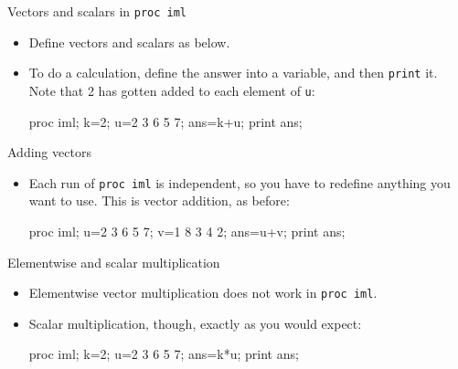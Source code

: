 \documentclass[unknownkeysallowed]{beamer}\usepackage[]{graphicx}\usepackage[]{color}
\begin{document}
\begin{frame}[fragile]{Vectors and scalars in \texttt{proc iml}}
  
  \begin{itemize}
  \item Define vectors and scalars as below.
    \item To do a calculation, define the answer into a variable, and
      then \texttt{print} it. Note that 2 has gotten added to each
      element of \texttt{u}:
    
    \begin{Sascode}[store=ima]
proc iml;
  k=2;
  u={2 3 6 5 7};
  ans=k+u;
  print ans;
    \end{Sascode}
    
      
  \end{itemize}
  
\end{frame}


\begin{frame}[fragile]{Adding vectors}
  
  \begin{itemize}
  \item Each run of \texttt{proc iml} is independent, so you have to
    redefine anything you want to use. This is vector addition, as before:
    
    \begin{Sascode}[store=imb]
proc iml;
  u={2 3 6 5 7};
  v={1 8 3 4 2};
  ans=u+v;
  print ans;
    \end{Sascode}
    
    
  \end{itemize}
  
\end{frame}

\begin{frame}[fragile]{Elementwise and scalar multiplication}
  
  \begin{itemize}
  \item Elementwise vector multiplication does not work in
    \texttt{proc iml}.
  \item Scalar multiplication, though, exactly as you would expect:

        \begin{Sascode}[store=imc]
proc iml;
  k=2;
  u={2 3 6 5 7};
  ans=k*u;
  print ans;
    \end{Sascode}
    

  \end{itemize}
  
\end{frame}
\end{document}
